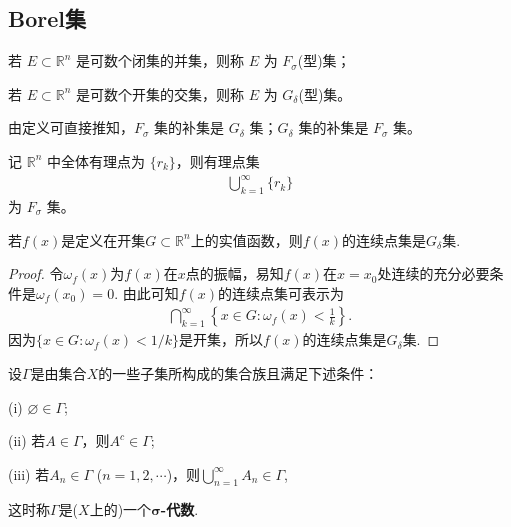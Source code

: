 \documentclass[../../main.tex]{subfiles}
\begin{document}
\subsection{Borel集}

\begin{definition}\label{definition:F_sigma,G_delta集}
若 $E \subset \mathbb{R}^n$ 是可数个闭集的并集，则称 $E$ 为 $F_{\sigma}$(型)集；

若 $E \subset \mathbb{R}^n$ 是可数个开集的交集，则称 $E$ 为 $G_{\delta}$(型)集。
\end{definition}
\begin{remark}
由定义可直接推知，$F_{\sigma}$ 集的补集是 $G_{\delta}$ 集；$G_{\delta}$ 集的补集是 $F_{\sigma}$ 集。
\end{remark}

\begin{example}
记 $\mathbb{R}^n$ 中全体有理点为 $\{r_k\}$，则有理点集
\begin{align*}
\bigcup_{k = 1}^{\infty} \{r_k\}
\end{align*}
为 $F_{\sigma}$ 集。 
\end{example}

\begin{example}[函数连续点的结构]
若$f(x)$是定义在开集$G\subset\mathbb{R}^n$上的实值函数，则$f(x)$的连续点集是$G_{\delta}$集.
\end{example}
\begin{proof}
令$\omega_f(x)$为$f(x)$在$x$点的振幅，易知$f(x)$在$x = x_0$处连续的充分必要条件是$\omega_f(x_0)=0$. 由此可知$f(x)$的连续点集可表示为
\begin{align*}
\bigcap_{k = 1}^{\infty}\left\{x\in G:\omega_f(x)<\frac{1}{k}\right\}.
\end{align*}
因为$\{x\in G:\omega_f(x)<1/k\}$是开集，所以$f(x)$的连续点集是$G_{\delta}$集. 

\end{proof}

\begin{definition}[$\sigma$-代数]
设$\Gamma$是由集合$X$的一些子集所构成的集合族且满足下述条件：

(i) $\varnothing\in\Gamma$;

(ii) 若$A\in\Gamma$，则$A^c\in\Gamma$;

(iii) 若$A_n\in\Gamma$ ($n = 1,2,\cdots$)，则$\bigcup_{n = 1}^{\infty}A_n\in\Gamma$,

这时称$\Gamma$是($X$上的)一个\textbf{$\boldsymbol{\sigma}$-代数}.
\end{definition}
\end{document}
